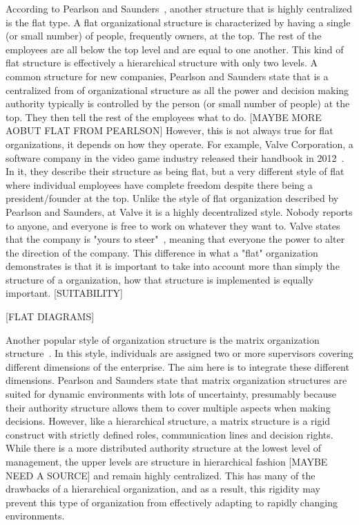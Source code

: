 According to Pearlson and Saunders~\cite{pearlson2009}, another structure that is highly centralized is the flat type. A flat organizational structure is characterized by having a single (or small number) of people, frequently owners, at the top. The rest of the employees are all below the top level and are equal to one another. This kind of flat structure is effectively a hierarchical structure with only two levels. A common structure for new companies, Pearlson and Saunders state that is a centralized from of organizational structure as all the power and decision making authority typically is controlled by the person (or small number of people) at the top. They then tell the rest of the employees what to do. [MAYBE MORE AOBUT FLAT FROM PEARLSON] However, this is not always true for flat organizations, it depends on how they operate. For example, Valve Corporation, a software company in the video game industry released their handbook in 2012~\cite{valveHandbook}. In it, they describe their structure as being flat, but a very different style of flat where individual employees have complete freedom despite there being a president/founder at the top. Unlike the style of flat organization described by Pearlson and Saunders, at Valve it is a highly decentralized style. Nobody reports to anyone, and everyone is free to work on whatever they want to. Valve states that the company is "yours to steer"~\cite{valveHandbook}, meaning that everyone the power to alter the direction of the company. This difference in what a "flat" organization demonstrates is that it is important to take into account more than simply the structure of a organization, how that structure is implemented is equally important. 
[SUITABILITY]

[FLAT DIAGRAMS]

Another popular style of organization structure is the matrix organization structure~\cite{pearlson2009}. In this style, individuals are assigned two or more supervisors covering different dimensions of the enterprise. The aim here is to integrate these different dimensions. Pearlson and Saunders state that matrix organization structures are suited for dynamic environments with lots of uncertainty, presumably because their authority structure allows them to cover multiple aspects when making decisions. However, like a hierarchical structure, a matrix structure is a rigid construct with strictly defined roles, communication lines and decision rights. While there is a more distributed authority structure at the lowest level of management, the upper levels are structure in hierarchical fashion [MAYBE NEED A SOURCE] and remain highly centralized. This has many of the drawbacks of a hierarchical organization, and as a result, this rigidity may prevent this type of organization from effectively adapting to rapidly changing environments. 

